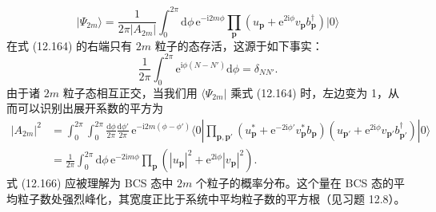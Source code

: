 \begin{equation*}
\left|\Psi_{2m}\right.\rangle=\frac{1}{2\pi\left|A_{2m}\right|}\int_0^{2\pi}\mathrm d\phi\,\mathrm e^{-\mathrm i 2m\phi}\prod_{\mathbf p}\left(u_{\mathbf p}+\mathrm e^{2\mathrm i\phi}v_{\mathbf p}b^\dagger_{\mathbf p}\right)\left|0\right.\rangle \tag{12.164}
\end{equation*}
在式 (12.164) 的右端只有 $2m$ 粒子的态存活，这源于如下事实：
\begin{equation*}
\frac{1}{2\pi}\int_0^{2\pi}\mathrm e^{\mathrm i\phi(N-N')}\mathrm d\phi=\delta_{NN'}. \tag{12.165}
\end{equation*}
由于诸 $2m$ 粒子态相互正交，当我们用 $\langle\Psi_{2m}|$ 乘式 (12.164) 时，左边变为 1，从而可以识别出展开系数的平方为
\begin{align*}
|A_{2m}|^2&=\int_0^{2\pi}\int_0^{2\pi}\frac{\mathrm d\phi}{2\pi}\frac{\mathrm d\phi'}{2\pi}\,\mathrm e^{-\mathrm i 2m(\phi-\phi')}\langle 0|\prod_{\mathbf p,\mathbf p'}\left(u^*_{\mathbf p}+\mathrm e^{-2\mathrm i\phi'}v^*_{\mathbf p}b_{\mathbf p}\right)\left(u_{\mathbf p'}+\mathrm e^{2\mathrm i\phi}v_{\mathbf p'}b^\dagger_{\mathbf p'}\right)|0\rangle\\
&=\frac{1}{2\pi}\int_0^{2\pi}\mathrm d\phi\,\mathrm e^{-2\mathrm i m\phi}\prod_{\mathbf p}\left(\left|u_{\mathbf p}\right|^2+\mathrm e^{2\mathrm i\phi}\left|v_{\mathbf p}\right|^2\right). \tag{12.166}
\end{align*}
式 (12.166) 应被理解为 BCS 态中 $2m$ 个粒子的概率分布。这个量在 BCS 态的平均粒子数处强烈峰化，其宽度正比于系统中平均粒子数的平方根（见习题 12.8）。

